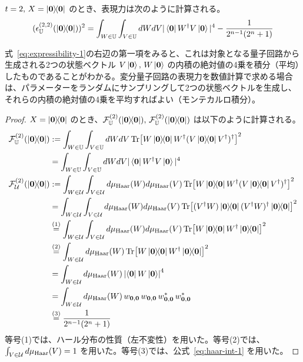 \begin{screen}
    \begin{corollary}\label{cor:expressibility}
        $t = 2,\, X = \dyad{\bs{0}}$ のとき、表現力は次のように計算される\cite{holmes2022connecting}。
        \begin{align}\label{eq:expressibility-1}
            (\epsilon_{\bbU}^{(2,2)}(\dyad{\bs{0}}))^2 = \int_{W\in\bbU}\int_{V\in\bbU} dWdV |\bra{\bs{0}}W\dg V\ket{\bs{0}}|^4 - \frac{1}{2^{n-1}(2^n + 1)}
        \end{align}
    \end{corollary}
\end{screen}
式~\ref{eq:expressibility-1}の右辺の第一項をみると、これは対象となる量子回路から生成される2つの状態ベクトル $V\ket{\boldsymbol{0}},\,W\ket{\boldsymbol{0}}$ の内積の絶対値の4乗を積分（平均）したものであることがわかる。変分量子回路の表現力を数値計算で求める場合は、パラメーターをランダムにサンプリングして2つの状態ベクトルを生成し、それらの内積の絶対値の4乗を平均すればよい（モンテカルロ積分）。

\begin{proof}
    $X = \dyad{\bs{0}}$ のとき、$\calF_{\bbU}^{(2)}(\dyad{\bs{0}}),\, \calF_{\bbU}^{(2)}(\dyad{\bs{0}})$ は以下のように計算される。
    \begin{align}
        \calF_{\bbU}^{(2)}(\dyad{\bs{0}})
        &:= \int_{W\in\bbU}\int_{V\in\bbU} dWdV \Tr[W\dyad{\bs{0}}W\dg (V\dyad{\bs{0}}V\dg)\dg]^2\\
        &= \int_{W\in\bbU}\int_{V\in\bbU} dWdV |\bra{\bs{0}}W\dg V\ket{\bs{0}}|^4\\
        \calF_{\calU}^{(2)}(\dyad{\bs{0}})
        &:= \int_{W\in\calU}\int_{V\in\calU} d\mu_{\Haar}(W)d\mu_{\Haar}(V) \Tr[W\dyad{\bs{0}}W\dg (V\dyad{\bs{0}}V\dg)\dg]^2\\
        &= \int_{W\in\calU}\int_{V\in\calU} d\mu_{\Haar}(W)d\mu_{\Haar}(V) \Tr[(V\dg W)\dyad{\bs{0}} (V\dg W)\dg\dyad{\bs{0}}]^2\\
        &\overset{(1)}{=} \int_{W\in\calU}\int_{V\in\calU} d\mu_{\Haar}(W)d\mu_{\Haar}(V) \Tr[W\dyad{\bs{0}} W\dg\dyad{\bs{0}}]^2\\
        &\overset{(2)}{=} \int_{W\in\calU} d\mu_{\Haar}(W) \Tr[W\dyad{\bs{0}} W\dg\dyad{\bs{0}}]^2\\
        &= \int_{W\in\calU} d\mu_{\Haar}(W)\, \abs{\bra{\bs{0}}W\ket{\bs{0}}}^4\\
        &= \int_{W\in\calU} d\mu_{\Haar}(W)\, w_{\bs{0},\bs{0}}\,w_{\bs{0},\bs{0}}\,w^\ast_{\bs{0},\bs{0}}\,w^\ast_{\bs{0},\bs{0}}\\
        &\overset{(3)}{=} \frac{1}{2^{n-1}(2^n + 1)}
    \end{align}
    等号(1)では、ハール分布の性質（左不変性）を用いた。等号(2)では、$\int_{V\in\mathcal{U}} d\mu_{\mathrm{Haar}}(V) = 1$ を用いた。等号(3)では、公式~\eqref{eq:haar-int-1} を用いた。
\end{proof}

